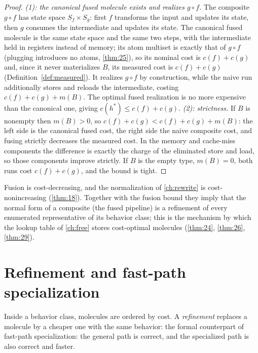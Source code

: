 \begin{proof}
\emph{(1): the canonical fused molecule exists and realizes $g \circ f$.} The
composite $g \circ f$ has state space $S_f \times S_g$: first $f$ transforms
the input and updates its state, then $g$ consumes the intermediate and
updates its state. The canonical fused molecule is the same state space and
the same two steps, with the intermediate held in registers instead of memory;
its atom multiset is exactly that of $g \circ f$ (plugging introduces no
atoms, \autoref{thm:25}), so its nominal cost is $c (f) + c (g)$ and, since it never
materializes $B$, its measured cost is $c (f) + c (g)$
(Definition~\ref{def:measured}). It realizes $g \circ f$ by construction,
while the naive run additionally stores and reloads the intermediate, costing
$c (f) + c (g) + m (B)$. The optimal fused realization is no more expensive than
the canonical one, giving $c (h^{*}) \le c (f) + c (g)$.
\emph{(2): strictness.} If $B$ is nonempty then $m (B) > 0$, so
$c (f) + c (g) < c (f) + c (g) + m (B)$: the left side is the canonical fused cost,
the right side the naive composite cost, and fusing strictly decreases the
measured cost. In the memory and cache-miss components the difference is
exactly the charge of the eliminated store and load, so those components
improve strictly. If $B$ is the empty type, $m (B) = 0$, both runs cost
$c (f) + c (g)$, and the bound is tight.
\end{proof}

\begin{remark}
Fusion is cost-decreasing, and the normalization of \autoref{ch:rewrite} is
cost-nonincreasing (\autoref{thm:18}). Together with the fusion bound they imply that the
normal form of a composite (the fused pipeline) is a refinement of every
enumerated representative of its behavior class; this is the mechanism by
which the lookup table of \autoref{ch:free} stores cost-optimal molecules
(\autoref{thm:24}, \autoref{thm:26}, \autoref{thm:29}).
\end{remark}

\section{Refinement and fast-path specialization}\label{sec:enrich-refine}

Inside a behavior class, molecules are ordered by cost. A \emph{refinement}
replaces a molecule by a cheaper one with the same behavior: the formal
counterpart of fast-path specialization: the general path is correct, and the
specialized path is also correct and faster.

